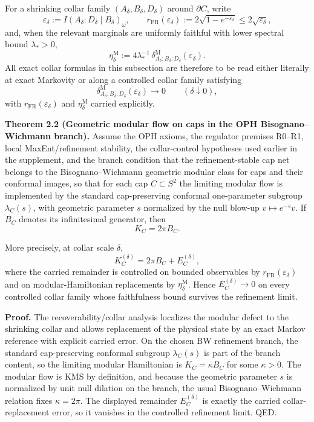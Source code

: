 For a shrinking collar family \((A_\delta,B_\delta,D_\delta)\) around \(\partial C\), write
\[
\varepsilon_\delta:=I(A_\delta:D_\delta\mid B_\delta)_\omega,
\qquad
r_{\mathrm{FR}}(\varepsilon_\delta):=
2\sqrt{1-e^{-\varepsilon_\delta}}
\le 2\sqrt{\varepsilon_\delta},
\]
and, when the relevant marginals are uniformly faithful with lower spectral bound \(\lambda_\ast>0\),
\[
\eta_\delta^{\mathrm M}
:=
4\lambda_\ast^{-1}\,
\delta^{\mathrm M}_{A_\delta:B_\delta:D_\delta}(\varepsilon_\delta).
\]
All exact collar formulas in this subsection are therefore to be read either literally at exact Markovity or along a controlled collar family satisfying
\[
\delta^{\mathrm M}_{A_\delta:B_\delta:D_\delta}(\varepsilon_\delta)\to 0
\qquad(\delta\downarrow 0),
\]
with \(r_{\mathrm{FR}}(\varepsilon_\delta)\) and \(\eta_\delta^{\mathrm M}\) carried explicitly.

\textbf{Theorem 2.2 (Geometric modular flow on caps in the OPH Bisognano--Wichmann branch).} Assume the OPH axioms, the regulator premises R0--R1, local MaxEnt/refinement stability, the collar-control hypotheses used earlier in the supplement, and the branch condition that the refinement-stable cap net belongs to the Bisognano--Wichmann geometric modular class for caps and their conformal images, so that for each cap \(C\subset S^2\) the limiting modular flow is implemented by the standard cap-preserving conformal one-parameter subgroup \(\lambda_C(s)\), with geometric parameter \(s\) normalized by the null blow-up \(v\mapsto e^{-s}v\). If \(B_C\) denotes its infinitesimal generator, then
\[
K_C=2\pi B_C.
\]

More precisely, at collar scale \(\delta\),
\[
K_C^{(\delta)}=2\pi B_C+E_C^{(\delta)},
\]
where the carried remainder is controlled on bounded observables by \(r_{\mathrm{FR}}(\varepsilon_\delta)\) and on modular-Hamiltonian replacements by \(\eta_\delta^{\mathrm M}\). Hence \(E_C^{(\delta)}\to 0\) on every controlled collar family whose faithfulness bound survives the refinement limit.

\textbf{Proof.} The recoverability/collar analysis localizes the modular defect to the shrinking collar and allows replacement of the physical state by an exact Markov reference with explicit carried error. On the chosen BW refinement branch, the standard cap-preserving conformal subgroup \(\lambda_C(s)\) is part of the branch content, so the limiting modular Hamiltonian is \(K_C=\kappa B_C\) for some \(\kappa>0\). The modular flow is KMS by definition, and because the geometric parameter \(s\) is normalized by unit null dilation on the branch, the usual Bisognano--Wichmann relation fixes \(\kappa=2\pi\). The displayed remainder \(E_C^{(\delta)}\) is exactly the carried collar-replacement error, so it vanishes in the controlled refinement limit. QED.


